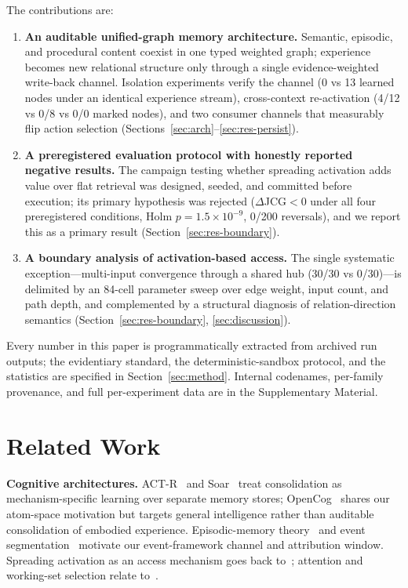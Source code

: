 \documentclass[10pt,a4paper]{article}
\begin{document}
The contributions are:
\begin{enumerate}
\item \textbf{An auditable unified-graph memory architecture.} Semantic, episodic, and procedural content coexist in one typed weighted graph; experience becomes new relational structure only through a single evidence-weighted write-back channel. Isolation experiments verify the channel (0 vs 13 learned nodes under an identical experience stream), cross-context re-activation (4/12 vs 0/8 vs 0/0 marked nodes), and two consumer channels that measurably flip action selection (Sections~\ref{sec:arch}--\ref{sec:res-persist}).
\item \textbf{A preregistered evaluation protocol with honestly reported negative results.} The campaign testing whether spreading activation adds value over flat retrieval was designed, seeded, and committed before execution; its primary hypothesis was rejected ($\Delta$JCG${<}0$ under all four preregistered conditions, Holm $p{=}1.5\times10^{-9}$, 0/200 reversals), and we report this as a primary result (Section~\ref{sec:res-boundary}).
\item \textbf{A boundary analysis of activation-based access.} The single systematic exception---multi-input convergence through a shared hub (30/30 vs 0/30)---is delimited by an 84-cell parameter sweep over edge weight, input count, and path depth, and complemented by a structural diagnosis of relation-direction semantics (Section~\ref{sec:res-boundary}, \ref{sec:discussion}).
\end{enumerate}

Every number in this paper is programmatically extracted from archived run outputs; the evidentiary standard, the deterministic-sandbox protocol, and the statistics are specified in Section~\ref{sec:method}. Internal codenames, per-family provenance, and full per-experiment data are in the Supplementary Material.

\section{Related Work}
\label{sec:related}

\textbf{Cognitive architectures.} ACT-R~\citep{anderson2004integrated} and Soar~\citep{laird2012soar} treat consolidation as mechanism-specific learning over separate memory stores; OpenCog~\citep{hart2008opencog} shares our atom-space motivation but targets general intelligence rather than auditable consolidation of embodied experience. Episodic-memory theory~\citep{tulving1983elements,baddeley2000episodic} and event segmentation~\citep{zacks2007event,schacter2007remembering} motivate our event-framework channel and attribution window. Spreading activation as an access mechanism goes back to~\citet{collins1975spreading}; attention and working-set selection relate to~\citet{itti2001computational,posner1980orienting,cowan2001magical}.
\end{document}
